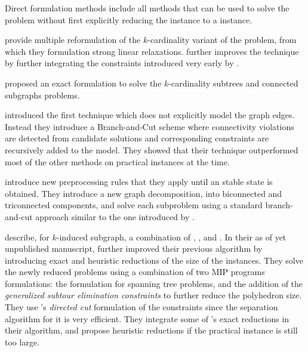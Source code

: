 	Direct formulation methods include all methods that can be used to solve the \mwcs{} problem without first explicitly reducing the \mwcs{} instance to a \pcst{} instance.

	\Textcite{quintao2008integer} provide multiple reformulation of the $k$-cardinality variant of the \mwcs{} problem, from which they formulation strong linear relaxations.
		\Textcite{quintao2010k} further improves the technique by further integrating the constraints introduced very early by \textcite{miller1960integer}.

		\Textcite{backes2012integer} proposed an exact formulation to solve the $k$-cardinality subtrees and connected subgraphs problems.

		\Textcites{alvarez2013maximum}{alvarez2013rooted} introduced the first technique which does not explicitly model the graph edges.
		Instead they introduce a Branch-and-Cut scheme where connectivity violations are detected from candidate solutions and corresponding constraints are recursively added to the model.
		They showed that their technique outperformed most of the other methods on practical instances at the time.

		\Textcite{el2014solving} introduce new preprocessing rules that they apply until an stable state is obtained.
		They introduce a new graph decomposition, into biconnected and triconnected components, and solve each subproblem using a standard branch-and-cut approach similar to the one introduced by \textcite{alvarez2013maximum}.

		\Textcite{althaus2014algorithms} describe, for $k$-induced subgraph, a combination of \parencite{fischetti1994weighted}, \parencite{chimani2009obtaining}, and \parencite{cohen2010several}.
		In their as of yet unpublished manuscript, \textcite{althausalgorithms} further improved their previous algorithm by introducing exact and heuristic reductions of the size of the \mwcs{} instances.
		They solve the newly reduced problems using a combination of two MIP programs formulations: the \parencite{cohen2010several} formulation for spanning tree problems, and the addition of the \emph{generalized subtour elimination constraints} to further reduce the polyhedron size.
		They use \textcite{chimani2009obtaining}'s \emph{directed cut} formulation of the constraints since the separation algorithm for it is very efficient.
		They integrate some of \textcite{el2014solving}'s exact reductions in their algorithm, and propose heuristic reductions if the practical instance is still too large.

